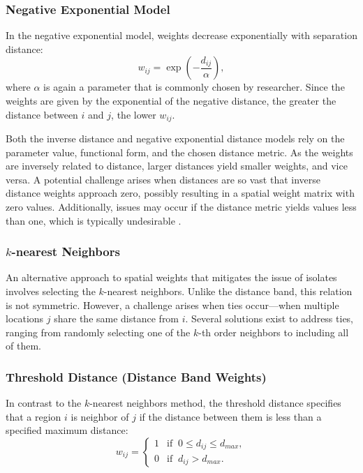 \subsubsection{Negative Exponential Model}

In the negative exponential model, weights decrease exponentially with separation distance:
\begin{equation*}
  w_{ij} = \exp\left(-\frac{d_{ij}}{\alpha}\right),
\end{equation*}
%
where $\alpha$ is again a parameter that is commonly chosen by researcher. Since the weights are given by the exponential of the negative distance, the greater the distance between $i$ and $j$, the lower $w_{ij}$.

Both the inverse distance and negative exponential distance models rely on the parameter value, functional form, and the chosen distance metric. As the weights are inversely related to distance, larger distances yield smaller weights, and vice versa. A potential challenge arises when distances are so vast that inverse distance weights approach zero, possibly resulting in a spatial weight matrix with zero values. Additionally, issues may occur if the distance metric yields values less than one, which is typically undesirable \citep{anselin2014modern}. 

\subsubsection{$k$-nearest Neighbors}

An alternative approach to spatial weights that mitigates the issue of isolates involves selecting the $k$-nearest neighbors. Unlike the distance band, this relation is not symmetric. However, a challenge arises when ties occur—when multiple locations $j$ share the same distance from $i$. Several solutions exist to address ties, ranging from randomly selecting one of the $k$-th order neighbors to including all of them.

\subsubsection{Threshold Distance (Distance Band Weights)}

In contrast to the $k$-nearest neighbors method, the threshold distance specifies that a region $i$ is neighbor of $j$ if the distance between them is less than a specified maximum distance:
\begin{equation*}
  w_{ij}= 
   \begin{cases}
      1 & \mbox{if}\;\; 0\leq d_{ij} \leq d_{max}, \\ 
      0 & \mbox{if}\;\; d_{ij} > d_{max}.
   \end{cases}
\end{equation*}



